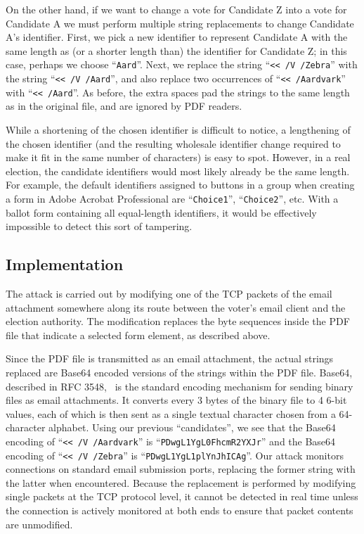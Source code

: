 \documentclass{article}
\newcommand{\etc}{etc.\xspace}
\begin{document}
On the other hand, if we want to change a vote for Candidate Z into a
vote for Candidate A we must perform multiple string replacements to
change Candidate A's identifier.  First, we pick a new identifier to
represent Candidate A with the same length as (or a shorter length
than) the identifier for Candidate Z; in this case, perhaps we choose
``\texttt{Aard}''. Next, we replace the string ``\texttt{<{}< /V
  /Zebra}'' with the string ``\texttt{<{}< /V
  /Aard\textvisiblespace}'', and also replace two occurrences of
``\texttt{<{}< /Aardvark}'' with ``\texttt{<{}<
  /Aard\textvisiblespace\textvisiblespace\textvisiblespace\textvisiblespace}''. As
before, the extra spaces pad the strings to the same length as in the
original file, and are ignored by PDF readers.

While a shortening of the chosen identifier is difficult to notice, a
lengthening of the chosen identifier (and the resulting wholesale
identifier change required to make it fit in the same number of
characters) is easy to spot. However, in a real election, the
candidate identifiers would most likely already be the same
length. For example, the default identifiers assigned to buttons in a
group when creating a form in Adobe Acrobat Professional are
``\texttt{Choice1}'', ``\texttt{Choice2}'', \etc With a ballot form
containing all equal-length identifiers, it would be effectively
impossible to detect this sort of tampering.

\subsection{Implementation}

The attack is carried out by modifying one of the TCP packets of the
email attachment somewhere along its route between the voter's email
client and the election authority. The modification replaces the byte
sequences inside the PDF file that indicate a selected form element,
as described above.

Since the PDF file is transmitted as an email attachment, the actual
strings replaced are Base64 encoded versions of the strings within the
PDF file. Base64, described in RFC 3548,~\cite{RFC3548} is the
standard encoding mechanism for sending binary files as email
attachments. It converts every 3 bytes of the binary file to 4 6-bit
values, each of which is then sent as a single textual character
chosen from a 64-character alphabet. Using our previous
``candidates'', we see that the Base64 encoding of ``\texttt{<{}< /V
  /Aardvark}'' is ``\texttt{PDwgL1YgL0FhcmR2YXJr}'' and the Base64
encoding of ``\texttt{<{}< /V
  /Zebra\textvisiblespace\textvisiblespace\textvisiblespace}'' is
``\texttt{PDwgL1YgL1plYnJhICAg}''. Our attack monitors connections on
standard email submission ports, replacing the former string with the
latter when encountered. Because the replacement is performed by
modifying single packets at the TCP protocol level, it cannot be
detected in real time unless the connection is actively monitored at
both ends to ensure that packet contents are unmodified.
\end{document}
